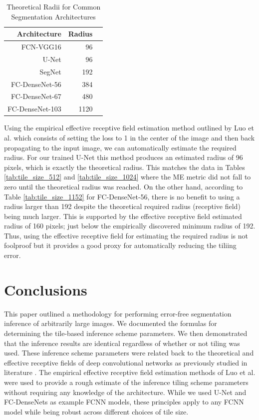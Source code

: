 \documentclass[runningheads]{llncs}
\begin{document}
\begin{table}[h!]
	\centering
	\caption{Theoretical Radii for Common Segmentation Architectures}
	\label{tab:common_radii}
	\begin{tabular}{r|r|r}
		Architecture & Radius &  \\ 
		\hline
		FCN-VGG16 \cite{Long2015} & 96 \\
		U-Net \cite{Ronneberger2015a} & 96 \\
		SegNet \cite{Badrinarayanan2015a} & 192 \\
		FC-DenseNet-56 \cite{Jegou2017} & 384 \\
		FC-DenseNet-67 \cite{Jegou2017} & 480 \\
		FC-DenseNet-103 \cite{Jegou2017} & 1120 \\
	\end{tabular}
\end{table}

Using the empirical effective receptive field estimation method outlined by Luo et al. \cite{Luo2016} which consists of setting the loss to 1 in the center of the image and then back propagating to the input image, we can automatically estimate the required radius. For our trained U-Net \cite{Ronneberger2015a} this method produces an estimated radius of 96 pixels, which is exactly the theoretical radius. This matches the data in Tables \ref{tab:tile_size_512} and \ref{tab:tile_size_1024} where the ME metric did not fall to zero until the theoretical radius was reached. On the other hand, according to Table \ref{tab:tile_size_1152} for FC-DenseNet-56, there is no benefit to using a radius larger than 192 despite the theoretical required radius (receptive field) being much larger. This is supported by the effective receptive field estimated radius of 160 pixels; just below the empirically discovered minimum radius of 192. Thus, using the effective receptive field for estimating the required radius is not foolproof but it provides a good proxy for automatically reducing the tiliing error. 


\section{Conclusions}
\label{conclusion}

This paper outlined a methodology for performing error-free segmentation inference of arbitrarily large images. 
We documented the formulas for determining the tile-based inference scheme parameters. We then demonstrated that the inference results are identical regardless of whether or not tiling was used. These inference scheme parameters were related back to the theoretical and effective receptive fields of deep convolutional networks as previously studied in literature \cite{Luo2016}. The empirical effective receptive field estimation methods of Luo et al. \cite{Luo2016} were used to provide a rough estimate of the inference tiling scheme parameters without requiring any knowledge of the architecture.
While we used U-Net and FC-DenseNets as example FCNN models, these principles apply to any FCNN model while being robust across different choices of tile size. 
\end{document}
